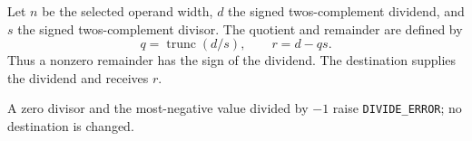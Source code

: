 Let \(n\) be the selected operand width, \(d\) the signed two\textquotesingle{}s-complement dividend, and \(s\) the signed two\textquotesingle{}s-complement divisor. The quotient and remainder are defined by
\[
  q = \operatorname{trunc}(d/s),
  \qquad r = d - qs .
\]
Thus a nonzero remainder has the sign of the dividend. The destination supplies the dividend and receives \(r\).

A zero divisor and the most-negative value divided by \(-1\) raise \texttt{DIVIDE\_ERROR}; no destination is changed.
